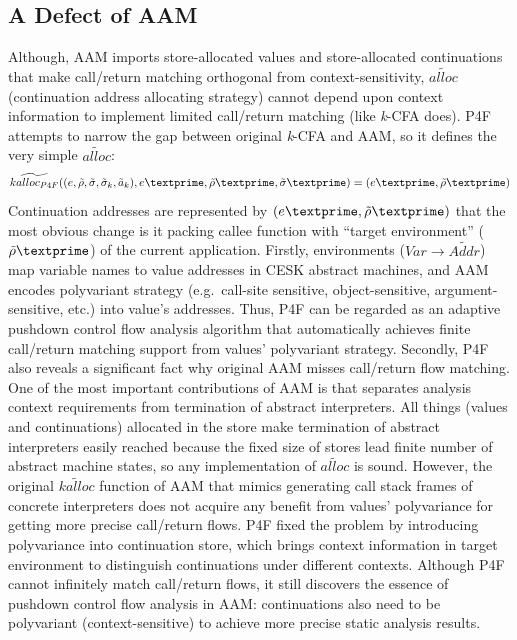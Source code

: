 \documentclass{article}
\begin{document}
\subsection{A Defect of AAM}
\label{sub:Defect}
Although, AAM imports store-allocated values and store-allocated continuations that make call/return matching orthogonal from context-sensitivity, $\widetilde{alloc}$ (continuation address allocating strategy) cannot depend upon context information to implement limited call/return matching (like \textit{k}-CFA does).
P4F attempts to narrow the gap between original \textit{k}-CFA and AAM, so it defines the very simple $\widetilde{alloc}$:
\[
\widetilde{kalloc_{P4F}} ((e, \tilde{\rho}, \tilde{\sigma}, \tilde{\sigma}_k, \tilde{a}_k), e\textprime, \tilde{\rho}\textprime, \tilde{\sigma}\textprime) = (e\textprime, \tilde{\rho}\textprime)
\]
Continuation addresses are represented by $(e\textprime, \tilde{\rho}\textprime)$ that the most obvious change is it packing callee function with ``target environment'' ($\tilde{\rho}\textprime$) of the current application.
Firstly, environments ($Var \to \widetilde{Addr}$) map variable names to value addresses in CESK abstract machines, and AAM encodes polyvariant strategy (e.g.\ call-site sensitive, object-sensitive, argument-sensitive, etc.) into value's addresses.
Thus, P4F can be regarded as an adaptive pushdown control flow analysis algorithm that automatically achieves finite call/return matching support from values' polyvariant strategy. %
Secondly, P4F also reveals a significant fact why original AAM misses call/return flow matching.
One of the most important contributions of AAM is that separates analysis context requirements from termination of abstract interpreters.
All things (values and continuations) allocated in the store make termination of abstract interpreters easily reached because the fixed size of stores lead finite number of abstract machine states, so any implementation of $\widetilde{alloc}$ is sound.
However, the original $\widetilde{kalloc}$ function of AAM that mimics generating call stack frames of concrete interpreters does not acquire any benefit from values' polyvariance for getting more precise call/return flows.
P4F fixed the problem by introducing polyvariance into continuation store, which brings context information in target environment to distinguish continuations under different contexts.
Although P4F cannot infinitely match call/return flows, it still discovers the essence of pushdown control flow analysis in AAM\@: continuations also need to be polyvariant (context-sensitive) to achieve more precise static analysis results.
\end{document}
